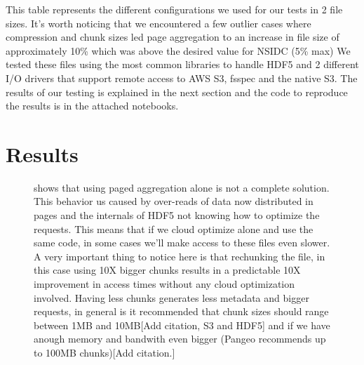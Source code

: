 \documentclass[
]{agujournal2019}
\begin{document}
This table represents the different configurations we used for our tests
in 2 file sizes. It's worth noticing that we encountered a few outlier
cases where compression and chunk sizes led page aggregation to an
increase in file size of approximately 10\% which was above the desired
value for NSIDC (5\% max) We tested these files using the most common
libraries to handle HDF5 and 2 different I/O drivers that support remote
access to AWS S3, fsspec and the native S3. The results of our testing
is explained in the next section and the code to reproduce the results
is in the attached notebooks.

\section{Results}\label{results}

\begin{figure}


\caption{\label{fig-4}shows that using paged aggregation alone is not a
complete solution. This behavior us caused by over-reads of data now
distributed in pages and the internals of HDF5 not knowing how to
optimize the requests. This means that if we cloud optimize alone and
use the same code, in some cases we'll make access to these files even
slower. A very important thing to notice here is that rechunking the
file, in this case using 10X bigger chunks results in a predictable 10X
improvement in access times without any cloud optimization involved.
Having less chunks generates less metadata and bigger requests, in
general is it recommended that chunk sizes should range between 1MB and
10MB{[}Add citation, S3 and HDF5{]} and if we have anough memory and
bandwith even bigger (Pangeo recommends up to 100MB chunks){[}Add
citation.{]}}

\end{figure}%
\end{document}
